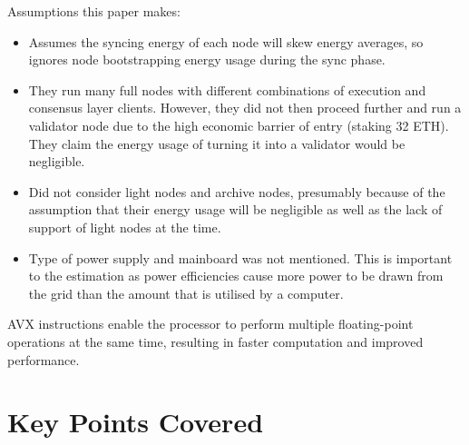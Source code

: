 Assumptions this paper makes:
\begin{itemize}
    \item Assumes the syncing energy of each node will skew energy averages, so ignores node bootstrapping energy usage during the sync phase.
    
    \item They run many full nodes with different combinations of execution and consensus layer clients. However, they did not then proceed further and run a validator node due to the high economic barrier of entry (staking 32 ETH). They claim the energy usage of turning it into a validator would be negligible.
    
    \item Did not consider light nodes and archive nodes, presumably because of the assumption that their energy usage will be negligible as well as the lack of support of light nodes at the time.

    \item Type of power supply and mainboard was not mentioned. This is important to the estimation as power efficiencies cause more power to be drawn from the grid than the amount that is utilised by a computer.
\end{itemize}



AVX instructions enable the processor to perform multiple floating-point operations at the same time, resulting in faster computation and improved performance. \cite{Schuchart2016TheScale}



\section{Key Points Covered}
